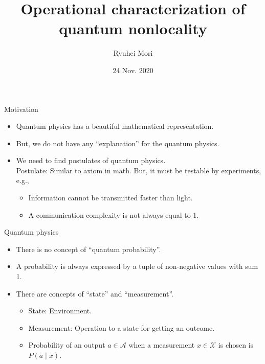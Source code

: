 \documentclass{beamer}
\title{Operational characterization of quantum nonlocality}
\author{Ryuhei Mori}
\institute{Tokyo Institute of Technology}
\date{24 Nov. 2020}
\newcommand\emm[1]{\textcolor{redorange}{{#1}}}
\begin{document}
\begin{frame}[plain]
\maketitle
\end{frame}

\begin{frame}{Motivation}
\begin{itemize}
\setlength{\itemsep}{3.0em}
\item Quantum physics has a beautiful mathematical representation.
\item But, we do not have any ``explanation'' for the quantum physics.
\item We need to find \emm{postulates} of quantum physics.\\
\vspace{1em}
Postulate: Similar to axiom in math. But, it must be testable by experiments, e.g.,
\begin{itemize}
\item Information cannot be transmitted faster than light.
\item A communication complexity is not always equal to 1.
\end{itemize}
\end{itemize}
\end{frame}


\begin{frame}{Quantum physics}
\begin{itemize}
\setlength{\itemsep}{3.5em}
\item There is no concept of ``quantum probability''.
\item A probability is always expressed by a tuple of non-negative values with sum 1.
\item There are concepts of ``\emm{state}'' and ``\emm{measurement}''.
\begin{itemize}
\item State: Environment.
\item Measurement: Operation to a state for getting an outcome.
\item Probability of an output $a\in\mathcal{A}$ when a measurement $x\in\mathcal{X}$ is chosen is $P(a\mid x)$.
\end{itemize}
\end{itemize}
\end{frame}
\end{document}
